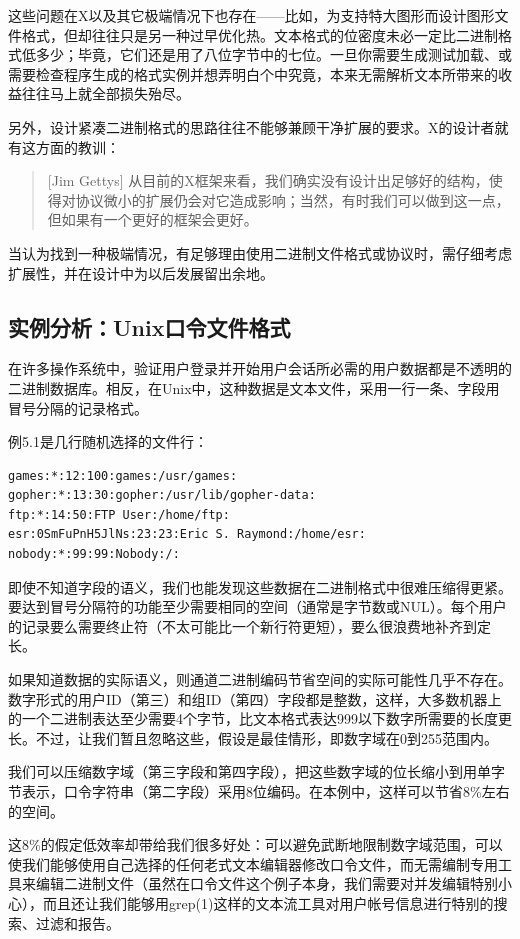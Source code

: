 \documentclass[12pt,oneside]{book}
\begin{document}
这些问题在X以及其它极端情况下也存在——比如，为支持特大图形而设计图形文件格式，但却往往只是另一种过早优化热。文本格式的位密度未必一定比二进制格式低多少；毕竟，它们还是用了八位字节中的七位。一旦你需要生成测试加载、或需要检查程序生成的格式实例并想弄明白个中究竟，本来无需解析文本所带来的收益往往马上就全部损失殆尽。

另外，设计紧凑二进制格式的思路往往不能够兼顾干净扩展的要求。X的设计者就有这方面的教训：
\begin{quote}[Jim Gettys]
从目前的X框架来看，我们确实没有设计出足够好的结构，使得对协议微小的扩展仍会对它造成影响；当然，有时我们可以做到这一点，但如果有一个更好的框架会更好。
\end{quote}


当认为找到一种极端情况，有足够理由使用二进制文件格式或协议时，需仔细考虑扩展性，并在设计中为以后发展留出余地。


\subsection{实例分析：Unix口令文件格式}
在许多操作系统中，验证用户登录并开始用户会话所必需的用户数据都是不透明的二进制数据库。相反，在Unix中，这种数据是文本文件，采用一行一条、字段用冒号分隔的记录格式。

例5.1是几行随机选择的文件行：
\begin{Verbatim}
games:*:12:100:games:/usr/games:
gopher:*:13:30:gopher:/usr/lib/gopher-data:
ftp:*:14:50:FTP User:/home/ftp:
esr:0SmFuPnH5JlNs:23:23:Eric S. Raymond:/home/esr:
nobody:*:99:99:Nobody:/:
\end{Verbatim}
即使不知道字段的语义，我们也能发现这些数据在二进制格式中很难压缩得更紧。要达到冒号分隔符的功能至少需要相同的空间（通常是字节数或NUL）。每个用户的记录要么需要终止符（不太可能比一个新行符更短），要么很浪费地补齐到定长。

如果知道数据的实际语义，则通道二进制编码节省空间的实际可能性几乎不存在。数字形式的用户ID（第三）和组ID（第四）字段都是整数，这样，大多数机器上的一个二进制表达至少需要4个字节，比文本格式表达999以下数字所需要的长度更长。不过，让我们暂且忽略这些，假设是最佳情形，即数字域在0到255范围内。

我们可以压缩数字域（第三字段和第四字段），把这些数字域的位长缩小到用单字节表示，口令字符串（第二字段）采用8位编码。在本例中，这样可以节省8\%{}左右的空间。

这8\%{}的假定低效率却带给我们很多好处：可以避免武断地限制数字域范围，可以使我们能够使用自己选择的任何老式文本编辑器修改口令文件，而无需编制专用工具来编辑二进制文件（虽然在口令文件这个例子本身，我们需要对并发编辑特别小心），而且还让我们能够用grep(1)这样的文本流工具对用户帐号信息进行特别的搜索、过滤和报告。
\end{document}
